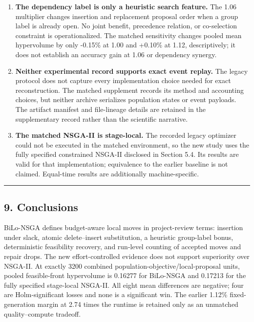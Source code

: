 \documentclass[
]{article}
\begin{document}
\begin{enumerate}
\item
  \textbf{The dependency label is only a heuristic search feature.} The 1.06 multiplier changes insertion and replacement proposal order when a group label is already open. No joint benefit, precedence relation, or co-selection constraint is operationalized. The matched sensitivity changes pooled mean hypervolume by only -0.15\% at 1.00 and +0.10\% at 1.12, descriptively; it does not establish an accuracy gain at 1.06 or dependency synergy.
\item
  \textbf{Neither experimental record supports exact event replay.} The legacy protocol does not capture every implementation choice needed for exact reconstruction. The matched supplement records its method and accounting choices, but neither archive serializes population states or event payloads. The artifact manifest and file-lineage details are retained in the supplementary record rather than the scientific narrative.
\item
  \textbf{The matched NSGA-II is stage-local.} The recorded legacy optimizer could not be executed in the matched environment, so the new study uses the fully specified constrained NSGA-II disclosed in Section 5.4. Its results are valid for that implementation; equivalence to the earlier baseline is not claimed. Equal-time results are additionally machine-specific.
\end{enumerate}

\begin{center}\rule{0.5\linewidth}{0.5pt}\end{center}

\subsection{9. Conclusions}\label{conclusions}

BiLo-NSGA defines budget-aware local moves in project-review terms: insertion under slack, atomic delete--insert substitution, a heuristic group-label bonus, deterministic feasibility recovery, and run-level counting of accepted moves and repair drops. The new effort-controlled evidence does not support superiority over NSGA-II. At exactly 3200 combined population-objective/local-proposal units, pooled feasible-front hypervolume is 0.16277 for BiLo-NSGA and 0.17213 for the fully specified stage-local NSGA-II. All eight mean differences are negative; four are Holm-significant losses and none is a significant win. The earlier 1.12\% fixed-generation margin at 2.74 times the runtime is retained only as an unmatched quality--compute tradeoff.
\end{document}
